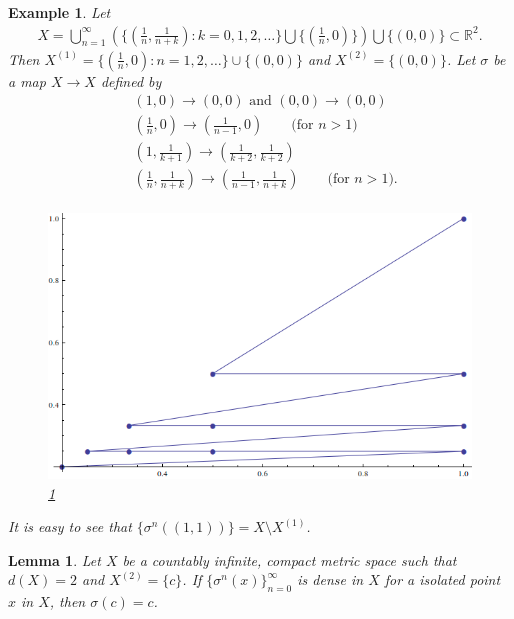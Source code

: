 \documentclass[a4paper,10pt]{amsart}
\newtheorem{example}{Example}[section]
\newtheorem{lemma}{Lemma}[section]
\newcommand{\R}{\mathbb R}  %
\begin{document}
\begin{example}\label{c_exa1}
    Let
    \begin{align*}
        X = \bigcup^{\infty}_{n=1} (\{ (\frac{1}{n}, \frac{1}{n+k}):
        k = 0,1, 2, \ldots \} \bigcup \{(\frac{1}{n},0)\})
        \bigcup \{(0,0)\}\subset \R^2.
    \end{align*}
    Then $X^{(1)} = \{(\frac{1}{n},0): n = 1, 2, \ldots \}
    \cup \{(0,0)\}$ and $X^{(2)} = \{(0,0)\}$.
    Let $\sigma$ be a map $X \rightarrow X$ defined by
    \begin{align*}
        & (1,0) \rightarrow (0,0) \mbox{ and } (0,0) \rightarrow (0,0) \\
        & (\frac{1}{n}, 0) \rightarrow (\frac{1}{n-1}, 0) \qquad 
        \mbox{(for $n > 1$)}\\
        &(1, \frac{1}{k+1}) \rightarrow (\frac{1}{k+2}, \frac{1}{k+2})\\
        &(\frac{1}{n}, \frac{1}{n+k}) \rightarrow  
        (\frac{1}{n-1}, \frac{1}{n+k}) \qquad \mbox{(for $n > 1$).} \\
    \end{align*}
\begin{figure}[h]
    \includegraphics[scale=0.45]{countable_example1.png}
    \caption{\cref{c_exa1}}
\end{figure}
It is easy to see that $\{ \sigma^{n}((1,1)) \} = X \setminus X^{(1)}$.
\end{example}



\begin{lemma} \label{c_lam3}
   Let $X$ be a countably infinite, compact metric space such that $d(X)=2$
   and $X^{(2)} = \{c\}$. If $\{ \sigma^{n}(x) \}_{n=0}^{\infty}$ 
   is dense in $X$ for a isolated point $x$ in $X$, then $\sigma(c) = c$.
\end{lemma}
\end{document}
